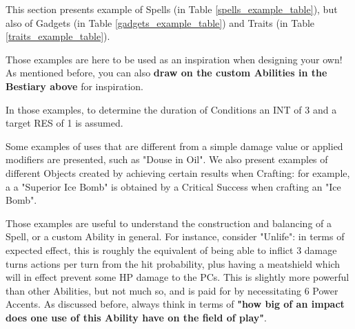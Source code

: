 \label{examples}

This section presents example of Spells (in Table \ref{spells_example_table}), but also of Gadgets (in Table \ref{gadgets_example_table}) and Traits (in Table \ref{traits_example_table}). 


\begin{rpg-examplebox}


Those examples are here to be used as an inspiration when designing your own! As mentioned before, you can also \textbf{draw on the custom Abilities in the Bestiary above} for inspiration.
\end{rpg-examplebox}


In those examples, to determine the duration of Conditions an INT of 3 and a target RES of 1 is assumed.

Some examples of uses that are different from a simple damage value or applied modifiers are presented, such as "Douse in Oil". We also present examples of different Objects created by achieving certain results when Crafting: for example, a a "Superior Ice Bomb" is obtained by a Critical Success when crafting an "Ice Bomb".

Those examples are useful to understand the construction and balancing of a Spell, or a custom Ability in general. For instance, consider "Unlife": in terms of expected effect, this is roughly the equivalent of being able to inflict 3 damage  turns  actions per turn  from the hit probability, plus having a meatshield which will in effect prevent some HP damage to the PCs. This is slightly more powerful than other Abilities, but not much so, and is paid for by necessitating 6 Power Accents. As discussed before, always think in terms of \textbf{"how big of an impact does one use of this Ability have on the field of play"}.

